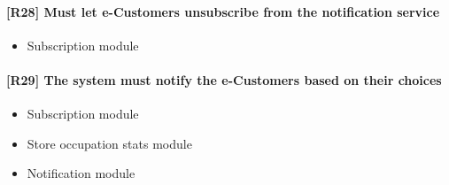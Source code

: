 \paragraph{[R28] Must let e-Customers unsubscribe from the notification service}
\begin{itemize}[itemsep=-1mm, topsep=-1mm]
	\item Subscription module
\end{itemize}

\paragraph{[R29] The system must notify the e-Customers based on their choices}
\begin{itemize}[itemsep=-1mm, topsep=-1mm]
	\item Subscription module
	\item Store occupation stats module
	\item Notification module
\end{itemize}
